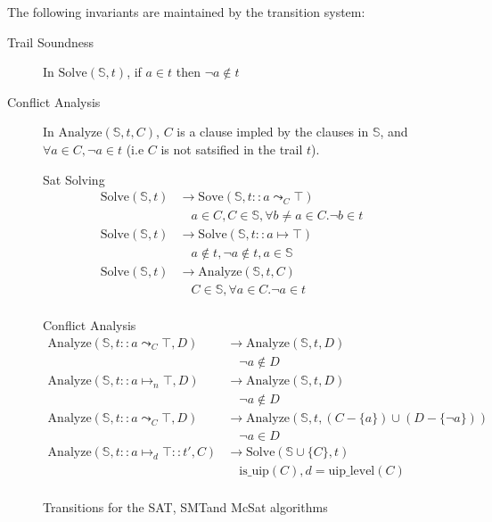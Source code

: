 The following invariants are maintained by the transition system:
\begin{description}
  \item[Trail Soundness] In $\text{Solve}(\mathbb{S}, t)$, if $a \in t$ then $\neg a \notin t$
  \item[Conflict Analysis] In $\text{Analyze}(\mathbb{S}, t, C)$, $C$ is a clause impled by the
    clauses in $\mathbb{S}$, and $\forall a \in C, \neg a \in t$ (i.e $C$ is not satsified in the
    trail $t$).
\end{description}

\begin{figure}
  \begin{center}
    Sat Solving
    \begin{align*}
      \text{Solve}(\mathbb{S}, t) &\rightarrow \text{Sove}(\mathbb{S}, t :: a \leadsto_C \top) \\
      &\quad a \in C, C \in \mathbb{S}, \forall b \neq a \in C. \neg b \in t \\
      \text{Solve}(\mathbb{S}, t) &\rightarrow \text{Solve}(\mathbb{S}, t :: a \mapsto \top) \\
      &\quad a \notin t, \neg a \notin t, a \in \mathbb{S} \\
      \text{Solve}(\mathbb{S}, t) &\rightarrow \text{Analyze}(\mathbb{S}, t, C) \\
      &\quad C \in \mathbb{S}, \forall a \in C. \neg a \in t \\
    \end{align*}

    Conflict Analysis
    \begin{align*}
      \text{Analyze}(\mathbb{S}, t :: a \leadsto_C \top, D) &\rightarrow \text{Analyze}(\mathbb{S}, t, D) \\
      &\quad \neg a \notin D \\
      \text{Analyze}(\mathbb{S}, t :: a \mapsto_n \top, D) &\rightarrow \text{Analyze}(\mathbb{S}, t, D) \\
      &\quad \neg a \notin D \\
      \text{Analyze}(\mathbb{S}, t :: a \leadsto_C \top, D) &\rightarrow \text{Analyze}(\mathbb{S}, t, (C - \{a\}) \cup (D - \{ \neg a\})) \\
      &\quad \neg a \in D \\
      \text{Analyze}(\mathbb{S}, t :: a \mapsto_d \top :: t', C) &\rightarrow \text{Solve}(\mathbb{S} \cup \{ C \}, t) \\
      &\quad \text{is\_uip}(C), d = \text{uip\_level}(C) \\
    \end{align*}

  \end{center}
  \caption{Transitions for the SAT, SMTand McSat algorithms}\label{fig:transitions}
\end{figure}

